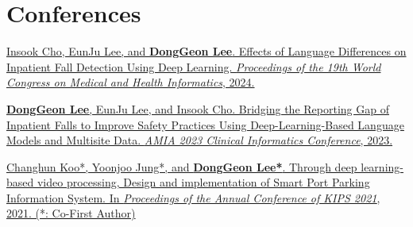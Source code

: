 \documentclass[letterpaper,11pt]{article}
\begin{document}
    \section{Conferences}
    \begin{enumerate}[noitemsep, leftmargin=*,label={[\arabic*]}]
        \item \href{https://pubmed.ncbi.nlm.nih.gov/38426881/}{Insook Cho, EunJu Lee, and \textbf{DongGeon Lee}. Effects of Language Differences on Inpatient Fall Detection Using Deep Learning. \textit{Proceedings of the 19th World Congress on Medical and Health Informatics}, 2024.}
        
        \item \href{https://bit.ly/cic23s47}{\textbf{DongGeon Lee}, EunJu Lee, and Insook Cho. Bridging the Reporting Gap of Inpatient Falls to Improve Safety Practices Using Deep-Learning-Based Language Models and Multisite Data. \textit{AMIA 2023 Clinical Informatics Conference}, 2023.}
        
        \item {\href{https://doi.org/10.3745/PKIPS.y2021m11a.1342}{Changhun Koo*, Yoonjoo Jung*, and \textbf{DongGeon Lee*}. Through deep learning-based video processing, Design and implementation of Smart Port Parking Information System. In \textit{Proceedings of the Annual Conference of KIPS 2021}, 2021. (*: Co-First Author)}}
    \end{enumerate}

    
\end{document}
